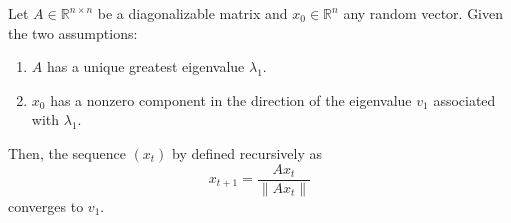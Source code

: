   \begin{theorem}
    \label{thm:convergence-of-power-iteration}
    Let $A \in \mathbb{R}^{n \times n}$ be a diagonalizable matrix and $x_0 \in \mathbb{R}^n$ any random vector. Given the two assumptions: 
    \begin{enumerate}
      \item $A$ has a unique greatest eigenvalue $\lambda_1$. 
      \item $x_0$ has a nonzero component in the direction of the eigenvalue $v_1$ associated with $\lambda_1$. 
    \end{enumerate}
    Then, the sequence $(x_t)$ by defined recursively as
    \begin{equation} 
      x_{t+1} = \frac{A x_t}{\|A x_t\|}
    \end{equation}
    converges to $v_1$. 
  \end{theorem}
